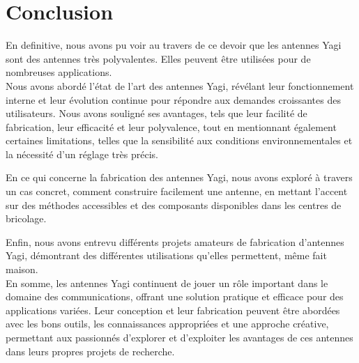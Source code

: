\documentclass[12pt, a4paper]{article}
\begin{document}
\section{Conclusion}
En definitive, nous avons pu voir au travers 
de ce devoir que les antennes Yagi sont des
antennes très polyvalentes. Elles peuvent être
utilisées pour de nombreuses applications.\\

Nous avons abordé l'état de l'art des antennes Yagi, 
révélant leur fonctionnement interne et leur 
évolution continue pour répondre aux demandes 
croissantes des utilisateurs. Nous avons souligné 
ses avantages, tels que leur facilité de fabrication, 
leur efficacité et leur polyvalence, tout en 
mentionnant également certaines limitations, 
telles que la sensibilité aux conditions 
environnementales et la nécessité d'un réglage très précis.

En ce qui concerne la fabrication des antennes Yagi, 
nous avons exploré à travers un cas 
concret, comment construire facilement une antenne,
en mettant l'accent sur des méthodes 
accessibles et des composants disponibles dans les 
centres de bricolage.

Enfin, nous avons entrevu différents projets 
amateurs de fabrication d'antennes Yagi, 
démontrant des différentes utilisations qu'elles permettent, 
même fait maison.\\

En somme, les antennes Yagi continuent de jouer un 
rôle important dans le domaine des communications, 
offrant une solution pratique et efficace pour des 
applications variées. Leur conception et leur 
fabrication peuvent être abordées avec les bons 
outils, les connaissances appropriées et une approche 
créative, permettant aux passionnés d'explorer et 
d'exploiter les avantages de ces antennes dans leurs 
propres projets de recherche.



\newpage


\end{document}

